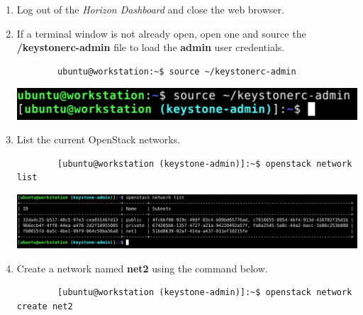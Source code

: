 \documentclass[letterpaper, 12pt]{article}
\begin{document}
\begin{enumerate}
    \item Log out of the \textit{Horizon Dashboard} and close the web browser.
    
    \item If a terminal window is not already open, open one and source the \textbf{\texttildemid/keystonerc-admin} file
    to load the \textbf{admin} user credentials.
    \begin{lstlisting}
        ubuntu@workstation:~$ source ~/keystonerc-admin
    \end{lstlisting}

    \begin{center}
        \includegraphics[width=\linewidth]{images/part3/step12.png}
    \end{center}

    \item List the current OpenStack networks.
    \begin{lstlisting}
        [ubuntu@workstation (keystone-admin)]:~$ openstack network list
    \end{lstlisting}

    \begin{center}
        \includegraphics[width=\linewidth]{images/part3/step13.png}
    \end{center}

    \item Create a network named \textbf{net2} using the command below.
    \begin{lstlisting}
        [ubuntu@workstation (keystone-admin)]:~$ openstack network create net2
    \end{lstlisting}


\end{enumerate}
\end{document}
